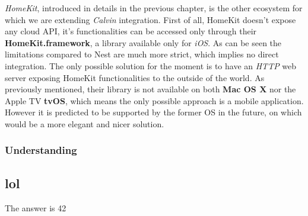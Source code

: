 \textit{HomeKit}, introduced in details in the previous chapter, is the other ecosystem
for which we are extending \textit{Calvin} integration. First of all, HomeKit doesn't
expose any cloud API, it's functionalities can be accessed only through their \textbf{HomeKit.framework},
a library available only for \textit{iOS}. As can be seen the limitations compared to Nest
are much more strict, which implies no direct integration. The only possible solution for the
moment is to have an \textit{HTTP} web server exposing HomeKit functionalities to the outside of
the world. As previously mentioned, their library is not available on both \textbf{Mac OS X} nor
the Apple TV \textbf{tvOS}, which means the only possible approach is a mobile application.
However it is predicted to be supported by the former OS in the future, on which would be a more
elegant and nicer solution.\\

\subsubsection{Understanding}















\subsection{lol}
The answer is 42
